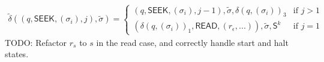 \documentclass[12pt]{article}
\begin{document}
\begin{multline*}
\tilde{\delta}
((q, \textsf{SEEK}, (\sigma_i), j), \tilde{\sigma}) =
\begin{cases}
(q, \textsf{SEEK}, (\sigma_i), j-1),  \tilde{\sigma}, \delta(q,(\sigma_i))_3 &
\text{if } j > 1 \\
(\delta(q,(\sigma_i))_1, \textsf{READ}, (r_{\epsilon},...)), \tilde{\sigma}, \textsf{S}^k &
\text{if } j = 1
\end{cases}
\end{multline*}
TODO: Refactor $r_s$ to $s$ in the read case, and correctly handle start and halt states.
\end{document}
